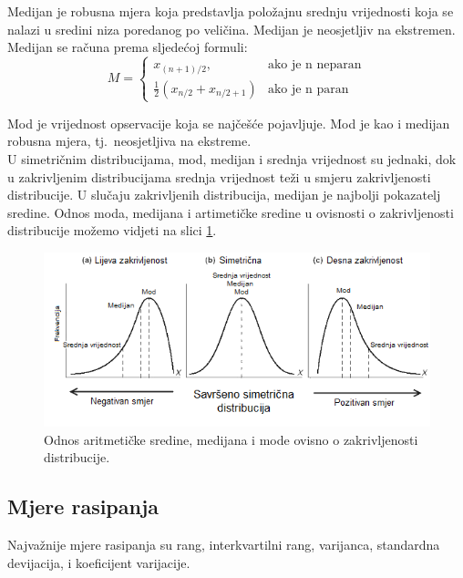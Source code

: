 \documentclass[times,utf8,zavrsni]{fer}
\begin{document}
Medijan je robusna mjera koja predstavlja položajnu srednju vrijednosti koja se nalazi u sredini niza poredanog po veličina. Medijan je neosjetljiv na ekstremen. Medijan se računa prema sljedećoj formuli:
\begin{equation}
\label{median}
M = \begin{cases}
x_{(n+1)/2}, &\text{ako je n neparan}\\
\frac{1}{2}(x_{n/2}+x_{n/2+1}) &\text{ako je n paran}
\end{cases}
\end{equation}



Mod je vrijednost opservacije koja se najčešće pojavljuje. Mod je kao i medijan robusna mjera, tj.~neosjetljiva na ekstreme. \\

U simetričnim distribucijama, mod, medijan i srednja vrijednost su jednaki, dok u zakrivljenim distribucijama srednja vrijednost teži u smjeru zakrivljenosti distribucije. U slučaju zakrivljenih distribucija, medijan je najbolji pokazatelj sredine. Odnos moda, medijana i artimetičke sredine u ovisnosti o zakrivljenosti distribucije možemo vidjeti na slici \ref{fig:meanmedmode}. \\

\begin{figure}[]
	\centering
	\includegraphics[width=\columnwidth]{img/meanmedianmode.png}
	\caption{Odnos aritmetičke sredine, medijana i mode ovisno o zakrivljenosti distribucije.\protect\footnotemark}
	\label{fig:meanmedmode}
\end{figure}


\subsection{Mjere rasipanja}
Najvažnije mjere rasipanja su rang, interkvartilni rang, varijanca, standardna devijacija, i koeficijent varijacije. \\
\end{document}
